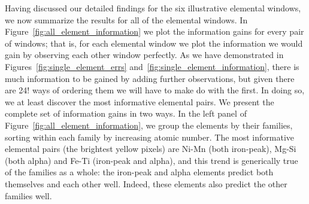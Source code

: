 \documentclass[a4paper,fleqn,usenatbib]{mnras}
\begin{document}
Having discussed our detailed findings for the six illustrative elemental windows, we now summarize the results for all of the elemental windows. In Figure~\ref{fig:all_element_information} we plot the information gains for every pair of windows; that is, for each elemental window we plot the information we would gain by observing each other window perfectly. As we have demonstrated in Figures~\ref{fig:single_element_errs} and~\ref{fig:single_element_information}, there is much information to be gained by adding further observations, but given there are 24! ways of ordering them we will have to make do with the first. In doing so, we at least discover the most informative elemental pairs. We present the complete set of information gains in two ways. In the left panel of Figure~\ref{fig:all_element_information}, we group the elements by their families, sorting within each family by increasing atomic number. The most informative elemental pairs (the brightest yellow pixels) are Ni-Mn (both iron-peak), Mg-Si (both alpha) and Fe-Ti (iron-peak and alpha), and this trend is generically true of the families as a whole: the iron-peak and alpha elements predict both themselves and each other well. Indeed, these elements also predict the other families well.
 
\end{document}
